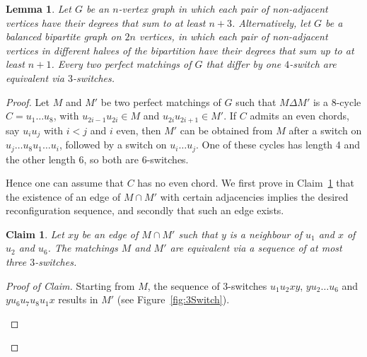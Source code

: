 \documentclass[11pt,a4paper]{article}
\newtheorem{lemma}[theorem]{Lemma}
\newtheorem{claim}[theorem]{Claim}
\theoremstyle{definition}
\newenvironment{poc}{\begin{proof}[Proof of
    Claim]\renewcommand*{\qedsymbol}{$\blacksquare$}}{\end{proof}}
\begin{document}
\begin{lemma}\label{lem:3Switch}
  Let $G$ be an $n$-vertex graph in which each pair of non-adjacent vertices have their degrees that sum to at least $n+3$.
  Alternatively, let $G$ be a balanced bipartite graph on $2n$ vertices, in which each pair of non-adjacent vertices in different halves of the bipartition have their degrees that sum up to at least $n+1$.
  Every two perfect matchings of $G$ that differ by one $4$-switch are equivalent via $3$-switches.
\end{lemma}

\begin{proof}
  Let $M$ and $M'$ be two perfect matchings of $G$ such that $M \Delta M'$ is a
  8-cycle $C = u_1\dots u_8$, with $u_{2i-1}u_{2i} \in M$ and
  $u_{2i}u_{2i+1} \in M'$. If $C$ admits an even chords, say $u_iu_j$ with
  $i < j$ and $i$ even, then $M'$ can be obtained from $M$ after a switch on
  $u_j\dots u_8u_1 \dots u_i$, followed by a switch on $u_i\dots u_j$. One of
  these cycles has length 4 and the other length 6, so both are $6$-switches.
  
  Hence one can assume that $C$ has no even chord. 
  We first prove in
  Claim~\ref{cl:3Switch} that the existence of an edge of $M\cap M'$ with certain
  adjacencies implies the desired reconfiguration sequence, and secondly that
  such an edge exists.

  \begin{claim}\label{cl:3Switch}
    Let $xy$ be an edge of $M \cap M'$ such that $y$ is a neighbour of
    $u_1$ and $x$ of $u_2$ and $u_6$. The matchings $M$ and $M'$ are equivalent
    via a sequence of at most three $3$-switches. 
  \end{claim}
  \begin{poc}
    Starting from $M$, the sequence
    of $3$-switches $u_1u_2xy$, $yu_2\dots u_6$ and $yu_6u_7u_8u_1x$ results in
    $M'$ (see Figure~\ref{fig:3Switch}).
    \begin{figure}[ht!]
      \centering        
\end{figure}
\end{poc}
\end{proof}
\end{document}
